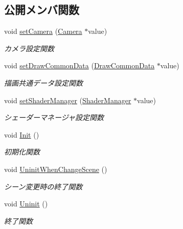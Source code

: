 \subsection*{公開メンバ関数}
\begin{DoxyCompactItemize}
\item 
void \mbox{\hyperlink{class_render_target_shadow_map_aaf7522ca239bc07bd78a6e431a28be09}{set\+Camera}} (\mbox{\hyperlink{class_camera}{Camera}} $\ast$value)
\begin{DoxyCompactList}\small\item\em カメラ設定関数 \end{DoxyCompactList}\item 
void \mbox{\hyperlink{class_render_target_shadow_map_a684f715afcbec6138c71f2a6021b89d1}{set\+Draw\+Common\+Data}} (\mbox{\hyperlink{class_draw_common_data}{Draw\+Common\+Data}} $\ast$value)
\begin{DoxyCompactList}\small\item\em 描画共通データ設定関数 \end{DoxyCompactList}\item 
void \mbox{\hyperlink{class_render_target_shadow_map_a25dfdffef70779c1a2eaaa6f2ebbf2d4}{set\+Shader\+Manager}} (\mbox{\hyperlink{class_shader_manager}{Shader\+Manager}} $\ast$value)
\begin{DoxyCompactList}\small\item\em シェーダーマネージャ設定関数 \end{DoxyCompactList}\item 
void \mbox{\hyperlink{class_render_target_shadow_map_a4ef385cc7898df1912bb158b21a97fc2}{Init}} ()
\begin{DoxyCompactList}\small\item\em 初期化関数 \end{DoxyCompactList}\item 
void \mbox{\hyperlink{class_render_target_shadow_map_ad81761c98d1ce21e104d28cf7b472199}{Uninit\+When\+Change\+Scene}} ()
\begin{DoxyCompactList}\small\item\em シーン変更時の終了関数 \end{DoxyCompactList}\item 
void \mbox{\hyperlink{class_render_target_shadow_map_a51ad9a4afe326c1bf93e342cb0b0847b}{Uninit}} ()
\begin{DoxyCompactList}\small\item\em 終了関数 \end{DoxyCompactList}\item 

\end{DoxyCompactItemize}

